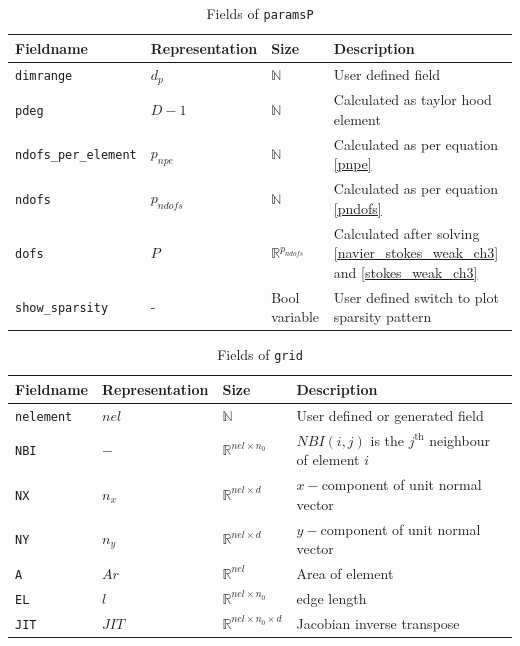 \documentclass[a4paper]{book}
\begin{document}
\begin{table}
\cprotect\caption{Fields of \verb|paramsP|}
\label{table_paramsP}
\begin{center}
\begin{tabular}{| p{}| p{} |  p{} | p{}|}
\hline
\textbf{Fieldname} & \textbf{Representation} & \textbf{Size} & \textbf{Description}\\
\hline
\verb|dimrange| & $d_p$ & $\mathbb{N}$ & User defined field\\
\hline
\verb|pdeg| & $D-1$ & $\mathbb{N}$ & Calculated as taylor hood element\\
\hline
\verb|ndofs_per_element| & $p_{npe}$ & $\mathbb{N}$ & Calculated as per equation \ref{pnpe}\\
\hline
\verb|ndofs| & $p_{ndofs}$ & $\mathbb{N}$ & Calculated as per equation \ref{pndofs}\\
\hline
\verb|dofs| & $P$ & $\mathbb{R}^{p_{ndofs}}$ & Calculated after solving \ref{navier_stokes_weak_ch3} and \ref{stokes_weak_ch3}\\
\hline
\verb|show_sparsity| & - & Bool variable & User defined switch to plot sparsity pattern\\
\hline
\end{tabular}
\end{center}
\end{table}

\begin{table}
\cprotect\caption{Fields of \verb|grid|}
\label{table_grid}
\begin{center}
\begin{tabular}{| p{}| p{} |  p{} | p{}|}
\hline
\textbf{Fieldname} & \textbf{Representation} & \textbf{Size} & \textbf{Description}\\
\hline
\verb|nelement| & $nel$ & $\mathbb{N}$ & User defined or generated field\\
\hline
\verb|NBI| & $-$ & $\mathbb{R}^{nel \times n_0}$ & $NBI(i,j)$ is the $j^{\textrm{th}}$ neighbour of element $i$\\
\hline
\verb|NX| & $n_x$ & $\mathbb{R}^{nel \times d}$ & $x-$component of unit normal vector\\
\hline
\verb|NY| & $n_y$ & $\mathbb{R}^{nel \times d}$ & $y-$component of unit normal vector\\
\hline
\verb|A| & $Ar$ & $\mathbb{R}^{nel}$ & Area of element\\
\hline
\verb|EL| & $l$ & $\mathbb{R}^{nel \times n_0}$ & edge length\\
\hline
\verb|JIT| & $JIT$ & $\mathbb{R}^{nel \times n_0 \times d}$ & Jacobian inverse transpose\\
\hline
\end{tabular}
\end{center}
\end{table}
\end{document}
